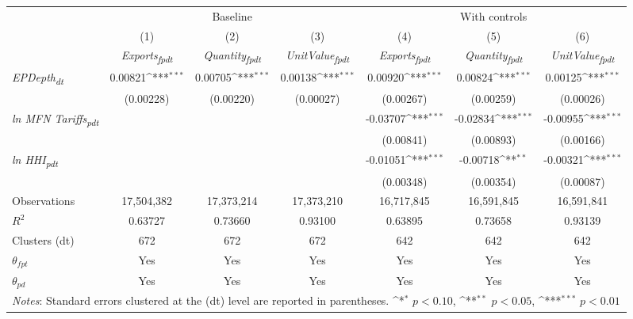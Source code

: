 {
\def\sym#1{\ifmmode^{#1}\else\(^{#1}\)\fi}
\begin{tabular}{l*{6}{c}}
\toprule
&\multicolumn{3}{c}{Baseline}&\multicolumn{3}{c}{With controls}\\\cmidrule(lr){2-4}\cmidrule(lr){5-7}
&(1)&(2)&(3)&(4)&(5)&(6)\\
&\textit{Exports\textsubscript{fpdt}}&\textit{Quantity\textsubscript{fpdt}}&\textit{UnitValue\textsubscript{fpdt}}&\textit{Exports\textsubscript{fpdt}}&\textit{Quantity\textsubscript{fpdt}}&\textit{UnitValue\textsubscript{fpdt}}\\
\midrule
\textit{EPDepth\textsubscript{dt}} & 0.00821\sym{***} & 0.00705\sym{***} & 0.00138\sym{***} & 0.00920\sym{***} & 0.00824\sym{***} & 0.00125\sym{***}\\
 & (0.00228) & (0.00220) & (0.00027) & (0.00267) & (0.00259) & (0.00026)\\
\addlinespace
\textit{ln MFN Tariffs\textsubscript{pdt}} &  &  &  & -0.03707\sym{***} & -0.02834\sym{***} & -0.00955\sym{***}\\
 &  &  &  & (0.00841) & (0.00893) & (0.00166)\\
\addlinespace
\textit{ln HHI\textsubscript{pdt}} &  &  &  & -0.01051\sym{***} & -0.00718\sym{**} & -0.00321\sym{***}\\
 &  &  &  & (0.00348) & (0.00354) & (0.00087)\\
\midrule
Observations & 17,504,382 & 17,373,214 & 17,373,210 & 16,717,845 & 16,591,845 & 16,591,841\\
$R^{2}$ & 0.63727 & 0.73660 & 0.93100 & 0.63895 & 0.73658 & 0.93139\\
Clusters (dt) & 672 & 672 & 672 & 642 & 642 & 642\\
$\theta_{fpt}$ & Yes & Yes & Yes & Yes & Yes & Yes\\
$\theta_{pd}$ & Yes & Yes & Yes & Yes & Yes & Yes\\
\bottomrule
\multicolumn{7}{l}{\footnotesize \textit{Notes}: Standard errors clustered at the (dt) level are reported in parentheses. \sym{*} \(p<0.10\), \sym{**} \(p<0.05\), \sym{***} \(p<0.01\)}\\
\end{tabular}
}
